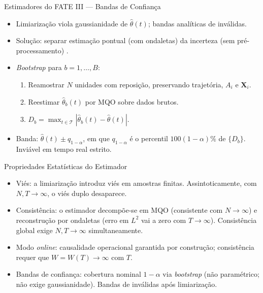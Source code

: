 \documentclass{beamer}
\begin{document}
\begin{frame}{Estimadores do FATE III — Bandas de Confiança}
\begin{itemize}
    \item Limiarização viola gaussianidade de \(\hat{\theta}(t)\); bandas analíticas de  inválidas.
    \item Solução: separar estimação pontual (com ondaletas) da incerteza (sem pré-processamento) \cite{chatterjee_bootstrapping_2011}.
    \item \textit{Bootstrap} para \(b = 1, \ldots, B\):
    \begin{enumerate}
        \item Reamostrar \(N\) unidades com reposição, preservando trajetória, \(A_i\) e \(\mathbf{X}_i\).
        \item Reestimar \(\hat{\theta}_b(t)\) por MQO sobre dados brutos.
        \item \(D_b = \max_{t \in \mathcal{T}} |\hat{\theta}_b(t) - \hat{\theta}(t)|\).
    \end{enumerate}
    \item Banda: \(\hat{\theta}(t) \pm q_{1-\alpha}\), em que \(q_{1-\alpha}\) é o percentil \(100(1{-}\alpha)\%\) de \(\{D_b\}\). Inviável em tempo real estrito.
\end{itemize}
\end{frame}

\begin{frame}{Propriedades Estatísticas do Estimador}
\begin{itemize}
    \item Viés: a limiarização introduz viés em amostras finitas. Assintoticamente, com \(N, T \to \infty\), o viés duplo desaparece.
    \item Consistência: o estimador decompõe-se em MQO (consistente com \(N\to\infty\)) e reconstrução por ondaletas (erro em \(L^2\) vai a zero com \(T\to\infty\)). Consistência global exige \(N, T \to \infty\) simultaneamente.
    \item Modo \textit{online}: causalidade operacional garantida por construção; consistência requer que \(W = W(T) \to \infty\) com \(T\).
    \item Bandas de confiança: cobertura nominal \(1-\alpha\) via \textit{bootstrap} (não paramétrico; não exige gaussianidade). Bandas de  inválidas após limiarização.
\end{itemize}
\end{frame}
\end{document}
